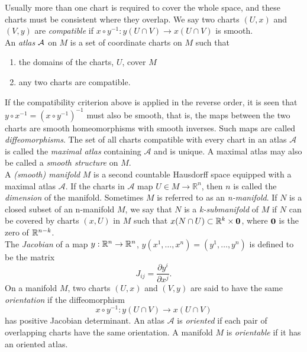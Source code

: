 Usually more than one chart is required to cover the whole space, and these
charts must be consistent where they overlap. We say two charts $(U, x)$ and
$(V, y)$ are \textit{compatible} if $x \circ y^{-1} : y(U\cap V) \rightarrow x(U\cap V)$
is smooth. \\

An \textit{atlas} $\cal A$ on $M$ is a set of coordinate charts on $M$ such
that 
\begin{enumerate}
\item the domains of the charts, $U$, cover $M$
\item any two charts are compatible.
\end{enumerate}
If the compatibility criterion above is applied in the reverse order, it is seen
that $y \circ x^{-1} = (x \circ y^{-1})^{-1}$ must also be smooth, that is, the
maps between the two charts are smooth homeomorphisms with smooth inverses. Such
maps are called \textit{diffeomorphisms}. The set of all charts compatible with
every chart in an atlas $\mathcal{A}$ is called the \textit{maximal atlas}
containing $\mathcal{A}$ and is unique. A maximal atlas may also be called a
\textit{smooth structure} on $M$.\\

A \textit{(smooth) manifold} $M$ is a second countable Hausdorff space equipped
with a maximal atlas $\mathcal{A}$. If the charts in $\mathcal{A}$ map $U\in
M\rightarrow \mathbb{R}^n$, then $n$ is called the \textit{dimension} of the
manifold. Sometimes $M$ is referred to as an \textit{n-manifold}. If $N$ is a
closed subset of an n-manifold $M$, we say that $N$ is a \textit{k-submanifold}
of $M$ if $N$ can be covered by charts $(x,U)$ in $M$ such that $x(N\cap
U)\subset {\mathbb R}^k\times {\bf 0}$, where ${\bf 0}$ is the zero of ${\mathbb R}^{n-k}$.\\ 

The \textit{Jacobian} of a map $y:{\mathbb R}^n\rightarrow {\mathbb R}^n$,
$y(x^1,\dots,x^n)=(y^1,\dots,y^n)$ is defined to be the matrix
\[ J_{ij}=\frac{\partial y^i}{\partial x^j}. \]
On a manifold $M$, two charts $(U,x)$ and $(V,y)$ are said to have the same
\textit{orientation} if the diffeomorphism 
\[ x\circ y^{-1} : y(U\cap V)\rightarrow x(U\cap V) \]
has positive Jacobian determinant. An atlas $\mathcal{A}$ is \textit{oriented}
if each pair of overlapping charts have the same orientation. A manifold $M$ is
\textit{orientable} if it has an oriented atlas.\\

